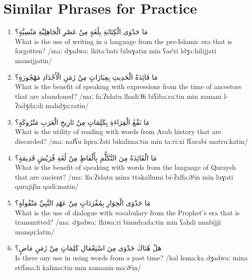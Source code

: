 \documentclass[letterpaper,12pt]{article}
\begin{document}
\section{Similar Phrases for Practice}

\begin{enumerate}
\item \textarabic{مَا جَدْوَى الْكِتَابَةِ بِلُغَةٍ مِنْ عَصْرِ الْجَاهِلِيَّةِ مَنْسِيَّةٍ؟}\\
What is the use of writing in a language from the pre-Islamic era that is forgotten? /maː dʒadwaː lkitaːbati biluɣatin min ʕasˤri ldʒaːhilijjati mansijjatin/

\item \textarabic{مَا فَائِدَةُ الْحَدِيثِ بِعِبَارَاتٍ مِنْ زَمَنِ الْأَجْدَادِ مَهْجُورَةٍ؟}\\
What is the benefit of speaking with expressions from the time of ancestors that are abandoned? /maː faːʔidatu lħadiːθi biʕibaːraːtin min zamani l-ʔadʒdaːdi mahdʒuːratin/

\item \textarabic{مَا نَفْعُ الْقِرَاءَةِ بِكَلِمَاتٍ مِنْ تَارِيخِ الْعَرَبِ مَتْرُوكَةٍ؟}\\
What is the utility of reading with words from Arab history that are discarded? /maː nafʕu lqiraːʔati bikalimaːtin min taːriːxi lʕarabi matruːkatin/

\item \textarabic{مَا الْفَائِدَةُ مِنَ التَّكَلُّمِ بِأَلْفَاظٍ مِنْ لُغَةِ قُرَيْشٍ قَدِيمَةٍ؟}\\
What is the benefit of speaking with words from the language of Quraysh that are ancient? /maː lfaːʔidatu mina ttakallumi bi-ʔalfaːðˤin min luɣati qurajiʃin qadiːmatin/

\item \textarabic{مَا جَدْوَى الْحِوَارِ بِمُفْرَدَاتٍ مِنْ عَهْدِ النَّبِيِّ مَنْقُولَةٍ؟}\\
What is the use of dialogue with vocabulary from the Prophet's era that is transmitted? /maː dʒadwaː lħiwaːri bimufradaːtin min ʕahdi nnabijji manquːlatin/

\item \textarabic{هَلْ هُنَاكَ جَدْوَى مِنَ اسْتِعْمَالِ كَلِمَاتٍ مِنْ زَمَنٍ مَاضٍ؟}\\
Is there any use in using words from a past time? /hal hunaːka dʒadwaː mina stiʕmaːli kalimaːtin min zamanin maːðˤin/
\end{enumerate}
\end{document}
